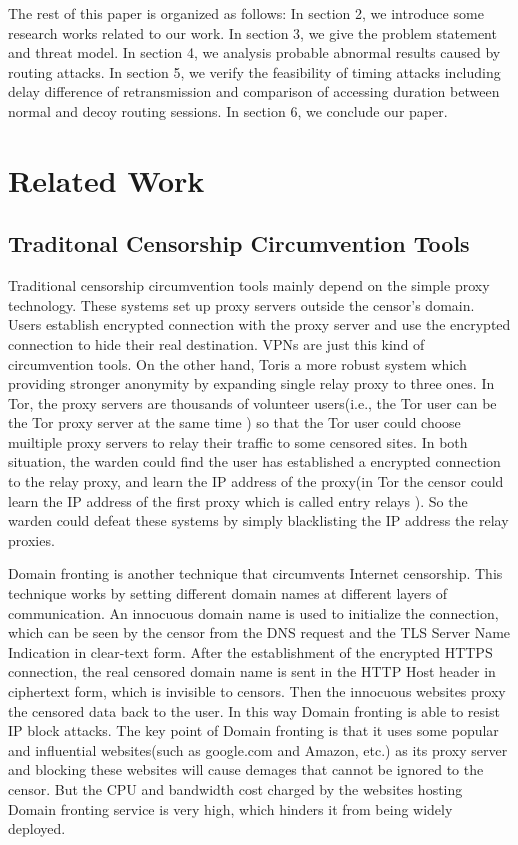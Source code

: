 \documentclass[conference]{IEEEtran}
\begin{document}
The rest of this paper is organized as follows: In section 2, we introduce some research works related to our work. In section 3, we give the problem statement and threat model. In section 4, we analysis probable abnormal results caused by routing attacks. In section 5, we verify the feasibility of timing attacks including delay difference of retransmission and comparison of accessing duration between normal and decoy routing sessions. In section 6, we conclude our paper.


\section{Related Work}

\subsection{Traditonal Censorship Circumvention Tools}
Traditional censorship circumvention tools mainly depend on the simple proxy technology. These systems set up proxy servers outside the censor's domain. Users establish encrypted connection with the proxy server and use the encrypted connection to hide their real destination. VPNs\cite{vpn1}\cite{vpn2} are just this kind of circumvention tools. On the other hand, Tor\cite{tor}is a more robust system which providing stronger anonymity by expanding single relay proxy to three ones. In Tor, the proxy servers are thousands of volunteer users(i.e., the Tor user can be the Tor proxy server at the same time ) so that the Tor user could choose muiltiple proxy servers to relay their traffic to some censored sites. In both situation, the warden could find the user has established a encrypted connection to the relay proxy, and learn the IP address of the proxy(in Tor the censor could learn the IP address of the first proxy which is called entry relays ). So the warden could defeat these systems by simply blacklisting the IP address the relay proxies.

Domain fronting\cite{domainfonting} is another technique that circumvents Internet censorship. This technique works by setting different domain names at different layers of communication. An innocuous domain name is used to initialize the connection, which can be seen by the censor from the DNS request and the TLS Server Name Indication in clear-text form. After the establishment of the encrypted HTTPS connection, the real censored domain name is sent in the HTTP Host header in ciphertext form, which is invisible to censors. Then the innocuous websites proxy the censored data back to the user. In this way Domain fronting is able to resist IP block attacks. The key point of Domain fronting is that it uses some popular and influential websites(such as google.com and Amazon, etc.) as its proxy server and blocking these websites will cause demages that cannot be ignored to the censor. But the CPU and bandwidth cost charged by the websites hosting Domain fronting service is very high, which hinders it from being widely deployed.
\end{document}
